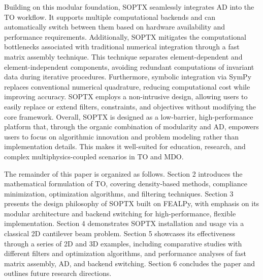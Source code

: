 \documentclass[mathpazo]{cicp}
\begin{document}
Building on this modular foundation, SOPTX seamlessly integrates AD into the TO workflow. It supports multiple computational backends and can automatically switch between them based on hardware availability and performance requirements. Additionally, SOPTX mitigates the computational bottlenecks associated with traditional numerical integration through a fast matrix assembly technique. This technique separates element-dependent and element-independent components, avoiding redundant computations of invariant data during iterative procedures. Furthermore, symbolic integration via SymPy~\cite{unknown} replaces conventional numerical quadrature, reducing computational cost while improving accuracy. SOPTX employs a non-intrusive design, allowing users to easily replace or extend filters, constraints, and objectives without modifying the core framework. Overall, SOPTX is designed as a low-barrier, high-performance platform that, through the organic combination of modularity and AD, empowers users to focus on algorithmic innovation and problem modeling rather than implementation details. This makes it well-suited for education, research, and complex multiphysics-coupled scenarios in TO and MDO.

The remainder of this paper is organized as follows. Section 2 introduces the mathematical formulation of TO, covering density-based methods, compliance minimization, optimization algorithms, and filtering techniques. Section 3 presents the design philosophy of SOPTX built on FEALPy, with emphasis on its modular architecture and backend switching for high-performance, flexible implementation. Section 4 demonstrates SOPTX installation and usage via a classical 2D cantilever beam problem. Section 5 showcases its effectiveness through a series of 2D and 3D examples, including comparative studies with different filters and optimization algorithms, and performance analyses of fast matrix assembly, AD, and backend switching. Section 6 concludes the paper and outlines future research directions.
\end{document}
